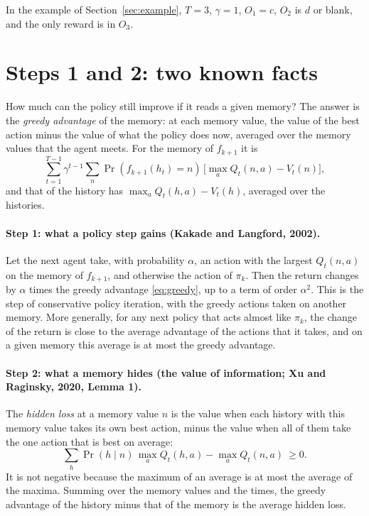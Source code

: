 \documentclass[11pt]{article}
\theoremstyle{definition}
\begin{document}
In the example of Section~\ref{sec:example}, $T=3$, $\gamma=1$, $O_1=c$, $O_2$ is $d$ or blank, and the only reward is in $O_3$.

\section{Steps 1 and 2: two known facts}

How much can the policy still improve if it reads a given memory? The answer is the \emph{greedy advantage} of the memory: at each memory value, the value of the best action minus the value of what the policy does now, averaged over the memory values that the agent meets. For the memory of $f_{k+1}$ it is
\begin{equation}\label{eq:greedy}
\sum_{t=1}^{T-1}\gamma^{t-1}\sum_n\Pr(f_{k+1}(h_t)=n)\,\big[\max_aQ_t(n,a)-V_t(n)\big],
\end{equation}
and that of the history has $\max_aQ_t(h,a)-V_t(h)$, averaged over the histories.

\paragraph{Step 1: what a policy step gains (Kakade and Langford, 2002).} Let the next agent take, with probability $\alpha$, an action with the largest $Q_t(n,a)$ on the memory of $f_{k+1}$, and otherwise the action of $\pi_k$. Then the return changes by $\alpha$ times the greedy advantage \eqref{eq:greedy}, up to a term of order $\alpha^2$. This is the step of conservative policy iteration, with the greedy actions taken on another memory. More generally, for any next policy that acts almost like $\pi_k$, the change of the return is close to the average advantage of the actions that it takes, and on a given memory this average is at most the greedy advantage.

\paragraph{Step 2: what a memory hides (the value of information; Xu and Raginsky, 2020, Lemma 1).} The \emph{hidden loss} at a memory value $n$ is the value when each history with this memory value takes its own best action, minus the value when all of them take the one action that is best on average:
\begin{equation}\label{eq:loss}
\sum_h\Pr(h\mid n)\,\max_aQ_t(h,a)-\max_aQ_t(n,a)\ \ge0 .
\end{equation}
It is not negative because the maximum of an average is at most the average of the maxima. Summing over the memory values and the times, the greedy advantage of the history minus that of the memory is the average hidden loss.
\end{document}
